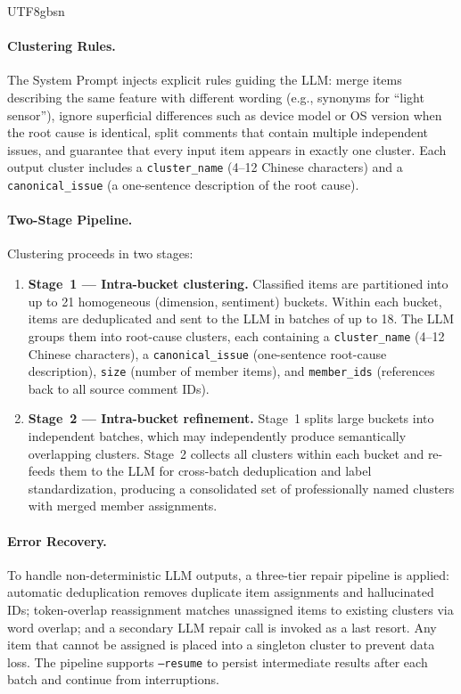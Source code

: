 \documentclass[11pt,a4paper]{article}
\begin{document}
\begin{CJK*}{UTF8}{gbsn}
\paragraph{Clustering Rules.} The System Prompt injects explicit rules guiding the LLM: merge items describing the same feature with different wording (e.g., synonyms for ``light sensor''), ignore superficial differences such as device model or OS version when the root cause is identical, split comments that contain multiple independent issues, and guarantee that every input item appears in exactly one cluster. Each output cluster includes a \texttt{cluster\_name} (4--12 Chinese characters) and a \texttt{canonical\_issue} (a one-sentence description of the root cause).

\paragraph{Two-Stage Pipeline.} Clustering proceeds in two stages:

\begin{enumerate}[nosep]
  \item \textbf{Stage~1 --- Intra-bucket clustering.} Classified items are partitioned into up to 21 homogeneous (dimension, sentiment) buckets. Within each bucket, items are deduplicated and sent to the LLM in batches of up to 18. The LLM groups them into root-cause clusters, each containing a \texttt{cluster\_name} (4--12 Chinese characters), a \texttt{canonical\_issue} (one-sentence root-cause description), \texttt{size} (number of member items), and \texttt{member\_ids} (references back to all source comment IDs).
  \item \textbf{Stage~2 --- Intra-bucket refinement.} Stage~1 splits large buckets into independent batches, which may independently produce semantically overlapping clusters. Stage~2 collects all clusters within each bucket and re-feeds them to the LLM for cross-batch deduplication and label standardization, producing a consolidated set of professionally named clusters with merged member assignments.
\end{enumerate}

\paragraph{Error Recovery.} To handle non-deterministic LLM outputs, a three-tier repair pipeline is applied: automatic deduplication removes duplicate item assignments and hallucinated IDs; token-overlap reassignment matches unassigned items to existing clusters via word overlap; and a secondary LLM repair call is invoked as a last resort. Any item that cannot be assigned is placed into a singleton cluster to prevent data loss. The pipeline supports \texttt{--resume} to persist intermediate results after each batch and continue from interruptions.


\end{CJK*}
\end{document}
